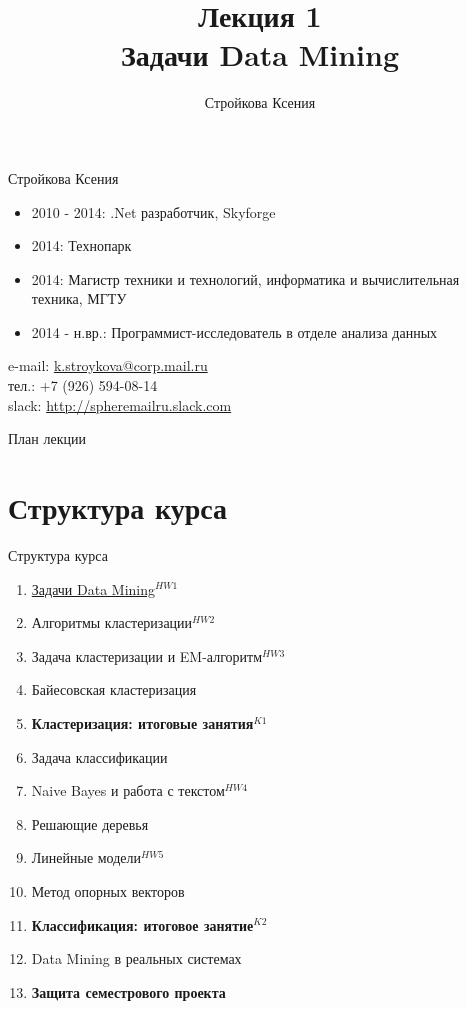 \documentclass[aspectratio=169]{beamer}
\author{Стройкова Ксения}
\title{\newline \newline \newline Лекция 1 \\ Задачи Data Mining}
\let\otp\titlepage
\renewcommand{\titlepage}{\otp\addtocounter{framenumber}{-1}}
\begin{document}
\begin{frame}[plain]
\titlepage
\end{frame}

\begin{frame}{Стройкова Ксения}
\begin{itemize}
	\item 2010 - 2014: .Net разработчик, Skyforge
	\item 2014: Технопарк
	\item 2014: Магистр техники и технологий, информатика и вычислительная техника, МГТУ
	\item 2014 - н.вр.: Программист-исследователь в отделе анализа данных
\end{itemize}

\begin{footnotesize}
e-mail: \href{mailto:k.stroykova@corp.mail.ru}{k.stroykova@corp.mail.ru} \\
тел.: +7 (926) 594-08-14 \\
slack: \url{http://spheremailru.slack.com}
\end{footnotesize}

\end{frame}

\begin{frame}{План лекции}
\tableofcontents
\end{frame}

\section{Структура курса}

\begin{frame}{Структура курса}

{\small
\begin{enumerate}
\item \underline{Задачи Data Mining}{\color{red}$^{HW1}$}
\item Алгоритмы кластеризации{\color{red}$^{HW2}$}
\item Задача кластеризации и EM-алгоритм{\color{red}$^{HW3}$}
\item Байесовская кластеризация
\item \textbf{Кластеризация: итоговые занятия}{\color{red}$^{K1}$}
\item Задача классификации
\item Naive Bayes и работа с текстом{\color{red}$^{HW4}$}
\item Решающие деревья
\item Линейные модели{\color{red}$^{HW5}$}
\item Метод опорных векторов
\item \textbf{Классификация: итоговое занятие}{\color{red}$^{K2}$}
\item Data Mining в реальных системах
\item \textbf{Защита семестрового проекта}
\end{enumerate}
}

\end{frame}
\end{document}
